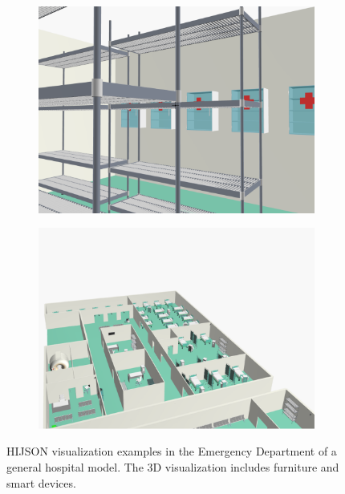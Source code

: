 \documentclass[]{egpubl}
\begin{document}
\begin{figure}[htbp]
\begin{subfigure}[b]{0.165\textwidth}
   \includegraphics[width=\textwidth]{images/emergency/12}
   \end{subfigure}
 \hspace{-1.5mm}   
   \begin{subfigure}[b]{0.165\textwidth}
   \includegraphics[width=\textwidth]{images/emergency/14}
   \end{subfigure}
   
   \caption{HIJSON visualization examples in the Emergency Department of a general hospital model. The 3D visualization includes furniture and smart devices.}
   \label{fig:meshes}
\end{figure}
\end{document}
